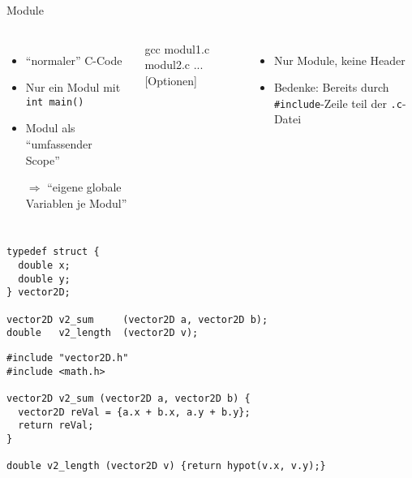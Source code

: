 
\begin{frame}[fragile]{Module}
%
\begin{columns}[T]
%
\begin{itemize}
\item \enquote{normaler} C-Code
\item Nur ein Modul mit \texttt{int main()}
\item Modul als \enquote{umfassender Scope}
\item[$\Rightarrow$] \enquote{eigene globale Variablen je Modul}
\end{itemize}
%
\begin{cmdbox}
\scriptsize
gcc modul1.c modul2.c ... [Optionen]
\end{cmdbox}
%
\begin{itemize}
\item Nur Module, keine Header
\item Bedenke: Bereits durch \texttt{#include}-Zeile teil der \texttt{.c}-Datei
\end{itemize}
\end{columns}
%
\end{frame}


\begin{frame}[fragile]
%
\begin{codebox}
\begin{verbatim}
typedef struct {
  double x;
  double y;
} vector2D;

vector2D v2_sum     (vector2D a, vector2D b);
double   v2_length  (vector2D v);
\end{verbatim}
\end{codebox}
%
\begin{codebox}
\begin{verbatim}
#include "vector2D.h"
#include <math.h>

vector2D v2_sum (vector2D a, vector2D b) {
  vector2D reVal = {a.x + b.x, a.y + b.y}; 
  return reVal;
}

double v2_length (vector2D v) {return hypot(v.x, v.y);}
\end{verbatim}
\end{codebox}
%
\end{frame}

